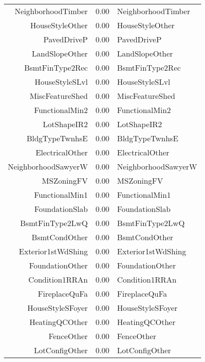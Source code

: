 \begin{table}[ht]
\begin{tabular}{rrl}
  NeighborhoodTimber & 0.00 & NeighborhoodTimber \\ 
  HouseStyleOther & 0.00 & HouseStyleOther \\ 
  PavedDriveP & 0.00 & PavedDriveP \\ 
  LandSlopeOther & 0.00 & LandSlopeOther \\ 
  BsmtFinType2Rec & 0.00 & BsmtFinType2Rec \\ 
  HouseStyleSLvl & 0.00 & HouseStyleSLvl \\ 
  MiscFeatureShed & 0.00 & MiscFeatureShed \\ 
  FunctionalMin2 & 0.00 & FunctionalMin2 \\ 
  LotShapeIR2 & 0.00 & LotShapeIR2 \\ 
  BldgTypeTwnhsE & 0.00 & BldgTypeTwnhsE \\ 
  ElectricalOther & 0.00 & ElectricalOther \\ 
  NeighborhoodSawyerW & 0.00 & NeighborhoodSawyerW \\ 
  MSZoningFV & 0.00 & MSZoningFV \\ 
  FunctionalMin1 & 0.00 & FunctionalMin1 \\ 
  FoundationSlab & 0.00 & FoundationSlab \\ 
  BsmtFinType2LwQ & 0.00 & BsmtFinType2LwQ \\ 
  BsmtCondOther & 0.00 & BsmtCondOther \\ 
  Exterior1stWdShing & 0.00 & Exterior1stWdShing \\ 
  FoundationOther & 0.00 & FoundationOther \\ 
  Condition1RRAn & 0.00 & Condition1RRAn \\ 
  FireplaceQuFa & 0.00 & FireplaceQuFa \\ 
  HouseStyleSFoyer & 0.00 & HouseStyleSFoyer \\ 
  HeatingQCOther & 0.00 & HeatingQCOther \\ 
  FenceOther & 0.00 & FenceOther \\ 
  LotConfigOther & 0.00 & LotConfigOther \\ 
   \hline
\end{tabular}
\end{table}
